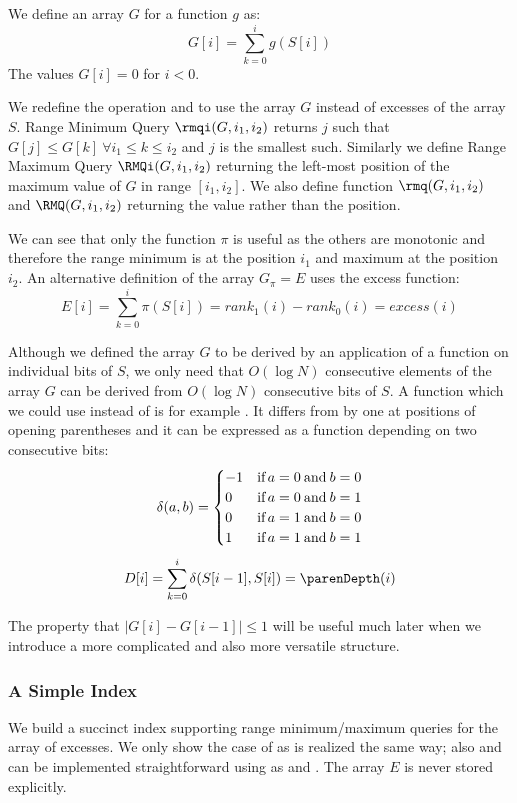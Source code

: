 We define an array $G$ for a function $g$ as:
$$ G[i] = \sum_{k = 0}^i g(S[i]) $$
The values $G[i] = 0$ for $i < 0$.

\bigbreak

We redefine the operation \rmqi and \RMQi to use the array $G$ instead of excesses of the array $S$.
Range Minimum Query $\rmqi(G, i_1, i_2)$ returns $j$ such that $G[j] \le G[k] \:\forall i_1 \le k \le i_2$ and $j$ is the smallest such.
Similarly we define Range Maximum Query $\RMQi(G, i_1, i_2)$ returning the left-most position of the maximum value of $G$ in range $[i_1, i_2]$.
We also define function $\rmq(G, i_1, i_2)$ and $\RMQ(G, i_1, i_2)$ returning the value rather than the position.

We can see that only the function $\pi$ is useful as the others are monotonic and therefore the range minimum is at the position $i_1$ and maximum at the position $i_2$.
An alternative definition of the array $G_\pi = E$ uses the excess function:
$$ E[i] = \sum_{k=0}^i \pi(S[i]) = rank_1(i) - rank_0(i) = excess(i) $$

\bigbreak

Although we defined the array $G$ to be derived by an application of a function on individual bits of $S$, we only need that $O(\log N)$ consecutive elements of the array $G$ can be derived from $O(\log N)$ consecutive bits of $S$.
A function which we could use instead of \excess{} is for example \parenDepth{}.
It differs from \excess{} by one at positions of opening parentheses and it can be expressed as a function depending on two consecutive bits:
$$\delta(a, b) = 
\begin{cases}
-1 &\operatorname{\textrm{if}} a = 0 \mathbin{\textrm{and}} b = 0 \\
0 &\operatorname{\textrm{if}} a = 0 \mathbin{\textrm{and}} b = 1 \\
0 &\operatorname{\textrm{if}} a = 1 \mathbin{\textrm{and}} b = 0 \\
1 &\operatorname{\textrm{if}} a = 1 \mathbin{\textrm{and}} b = 1
\end{cases}$$
$$ D[i] = \sum_{k=0}^i \delta(S[i - 1], S[i]) = \parenDepth(i) $$

The property that $| G[i] - G[i-1] | \le 1$ will be useful much later when we introduce a more complicated and also more versatile structure.

\subsubsection{A Simple Index}\label{sss:rmq-index}

We build a succinct index supporting range minimum/maximum queries for the array of excesses.
We only show the case of \rmqi{} as \RMQi{} is realized the same way; also \rmq{} and \RMQ{} can be implemented straightforward using \rmqi{} as \RMQi{} and \excess{}.
The array $E$ is never stored explicitly.

